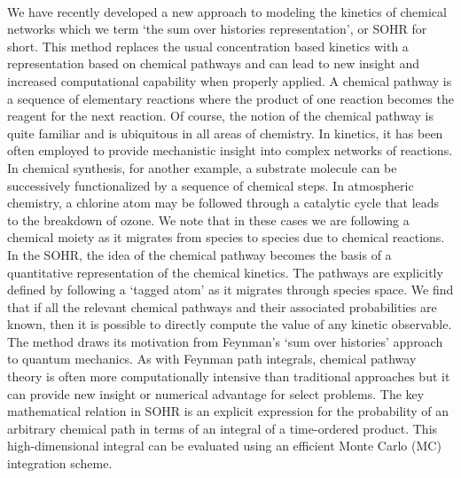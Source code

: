 \paragraph{}
We have recently developed a new approach to modeling the kinetics of chemical
networks which we term ‘the sum over histories representation’, or SOHR for short.\cite{ch1_IRPC_15_kramer2014following,ch1_IRPC_16_ch3_6_ch4_8_bai2014sum,ch1_IRPC_17_ch4_9_bai2015sum,ch1_IRPC_18_bai2017simulating} This method replaces the usual concentration based kinetics with a representation
based on chemical pathways and can lead to new insight and increased computational
capability when properly applied. A chemical pathway is a sequence of
elementary reactions where the product of one reaction becomes the reagent for the
next reaction. Of course, the notion of the chemical pathway is quite familiar and is
ubiquitous in all areas of chemistry. In kinetics, it has been often employed to provide
mechanistic insight into complex networks of reactions.\cite{ch1_IRPC_19_he2008graph,ch1_IRPC_20_lehmann2004algorithm,ch1_IRPC_21_feng2010dominant,ch1_IRPC_22_chern1990effective} In chemical synthesis,
for another example, a substrate molecule can be successively functionalized by a
sequence of chemical steps. In atmospheric chemistry, a chlorine atom may be followed
through a catalytic cycle that leads to the breakdown of ozone. We note that in these
cases we are following a chemical moiety as it migrates from species to species due to
chemical reactions. In the SOHR, the idea of the chemical pathway becomes the basis of a quantitative
representation of the chemical kinetics. The pathways are explicitly defined by
following a ‘tagged atom’ as it migrates through species space. We find that if all the
relevant chemical pathways and their associated probabilities are known, then it is possible
to directly compute the value of any kinetic observable. The method draws its
motivation from Feynman’s ‘sum over histories’ approach to quantum mechanics.\cite{ch4_26_feynman2010quantum}
As with Feynman path integrals, chemical pathway theory is often more computationally
intensive than traditional approaches but it can provide new insight or numerical
advantage for select problems.\cite{ch1_IRPC_24_makri1999time,ch1_IRPC_25_cao1994formulation,ch1_IRPC_26_berne1986simulation} The key mathematical relation in SOHR is an explicit expression for the probability of an arbitrary chemical path in terms of an
integral of a time-ordered product. This high-dimensional integral can be evaluated
using an efficient Monte Carlo (MC) integration scheme.
\newline
